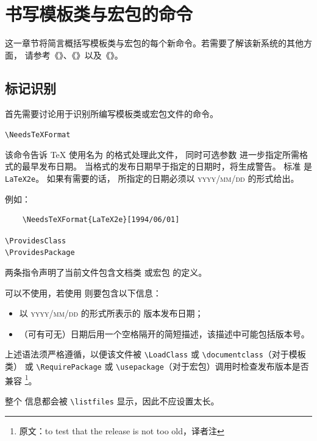\documentclass{ltxguide}[1995/11/28]
\begin{document}
\section{书写模板类与宏包的命令}
\label{Sec:commands}

这一章节将简言概括写模板类与宏包的每个新命令。若需要了解该新系统的其他方面，
请参考《\emph{\LaTeXbook}》、《\emph{\LaTeXcomp}》以及《\emph{\usrguide}》。

\subsection{标记识别}

首先需要讨论用于识别所编写模板类或宏包文件的命令。

\begin{decl}
	\verb|\NeedsTeXFormat|  
\end{decl}
该命令告诉 \TeX{} 使用名为  的格式处理此文件，
同时可选参数  进一步指定所需格式的最早发布日期。
当格式的发布日期早于指定的日期时，将生成警告。
标准  是 \texttt{LaTeX2e}。
如果有需要的话， 所指定的日期必须以
\textsc{yyyy/mm/dd} 的形式给出。

例如：
\begin{verbatim}
	\NeedsTeXFormat{LaTeX2e}[1994/06/01]
\end{verbatim}

\begin{decl}
	\verb|\ProvidesClass|   \\
	\verb|\ProvidesPackage|  
\end{decl}
两条指令声明了当前文件包含文档类  或宏包  的定义。

 可以不使用，若使用  则要包含以下信息：
\begin{itemize}
	\item 以 \textsc{yyyy/mm/dd} 的形式所表示的  版本发布日期；
	\item （可有可无）日期后用一个空格隔开的简短描述，该描述中可能包括版本号。
\end{itemize}
上述语法须严格遵循，以便该文件被 \verb|\LoadClass| 或 \verb|\documentclass|（对于模板类）
或 \verb|\RequirePackage| 或 \verb|\usepackage|（对于宏包）调用时检查发布版本是否兼容
\footnote{原文：to test that the release is not too old，译者注}。

整个  信息都会被 \verb|\listfiles| 显示，因此不应设置太长。
\end{document}
